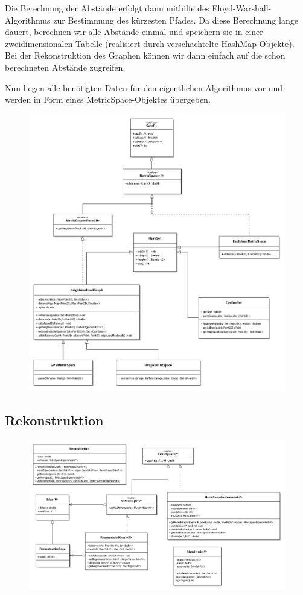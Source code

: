 \documentclass[parskip=half,
 fontsize=12pt, bibtotoc,
 ngerman]
 {article}
\begin{document}
Die Berechnung der Abstände erfolgt dann mithilfe des Floyd-Warshall-Algorithmus zur Bestimmung des kürzesten Pfades. Da diese Berechnung lange dauert, berechnen wir alle Abstände einmal und speichern sie in einer zweidimensionalen Tabelle (realisiert durch verschachtelte HashMap-Objekte). Bei der Rekonstruktion des Graphen können wir dann einfach auf die schon berechneten Abstände zugreifen.

Nun liegen alle benötigten Daten für den eigentlichen Algorithmus vor und werden in Form eines MetricSpace-Objektes übergeben.

\begin{figure}[h]
\centering
\includegraphics[scale=0.5]{preprocessing.png}
\end{figure}

\subsection{Rekonstruktion}

\begin{figure}[h]
\centering
\includegraphics[scale=0.5]{main.png}
\end{figure}
\end{document}
